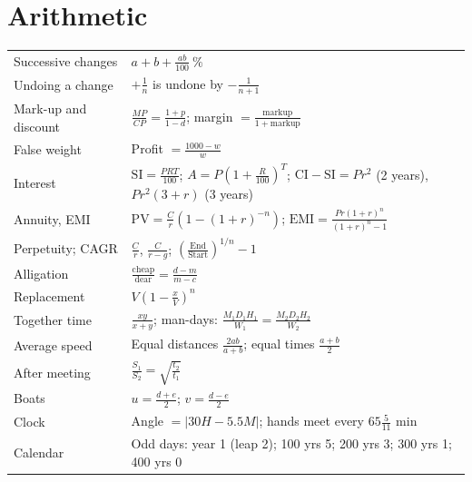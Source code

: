 \documentclass[11pt,a4paper,openany]{report}
\begin{document}
\section*{Arithmetic}
\begin{tabular}{>{\raggedright}p{5.4cm}>{\raggedright\arraybackslash}p{9.6cm}}
\toprule
Successive changes & $a+b+\frac{ab}{100}\ \%$\\
Undoing a change & $+\frac1n$ is undone by $-\frac1{n+1}$\\
Mark-up and discount & $\frac{MP}{CP}=\frac{1+p}{1-d}$; margin $=\frac{\text{markup}}{1+\text{markup}}$\\
False weight & Profit $=\frac{1000-w}{w}$\\
Interest & $\text{SI}=\frac{PRT}{100}$; $A=P(1+\frac R{100})^T$; $\text{CI}-\text{SI}=Pr^2$ (2 years), $Pr^2(3+r)$ (3 years)\\
Annuity, EMI & $\text{PV}=\frac Cr(1-(1+r)^{-n})$; $\text{EMI}=\frac{Pr(1+r)^n}{(1+r)^n-1}$\\
Perpetuity; CAGR & $\frac Cr$, $\frac C{r-g}$; $(\frac{\text{End}}{\text{Start}})^{1/n}-1$\\
Alligation & $\frac{\text{cheap}}{\text{dear}}=\frac{d-m}{m-c}$\\
Replacement & $V(1-\frac xV)^n$\\
Together time & $\frac{xy}{x+y}$; man-days: $\frac{M_1D_1H_1}{W_1}=\frac{M_2D_2H_2}{W_2}$\\
Average speed & Equal distances $\frac{2ab}{a+b}$; equal times $\frac{a+b}2$\\
After meeting & $\frac{S_1}{S_2}=\sqrt{\frac{t_2}{t_1}}$\\
Boats & $u=\frac{d+e}2$; $v=\frac{d-e}2$\\
Clock & Angle $=|30H-5.5M|$; hands meet every $65\frac5{11}$ min\\
Calendar & Odd days: year 1 (leap 2); 100 yrs 5; 200 yrs 3; 300 yrs 1; 400 yrs 0\\
\bottomrule
\end{tabular}
\end{document}
